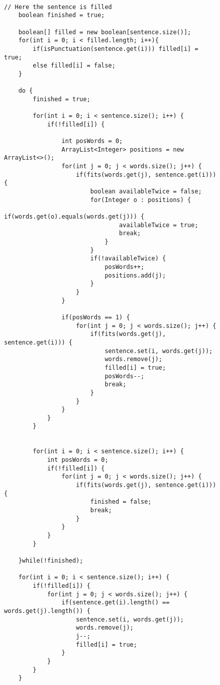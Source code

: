 \documentclass[a4paper, 12pt]{scrartcl}
\begin{document}
\begin{figure}[H]
    \centering
\begin{lstlisting}

// Here the sentence is filled
    boolean finished = true;
	        
    boolean[] filled = new boolean[sentence.size()];
    for(int i = 0; i < filled.length; i++){
        if(isPunctuation(sentence.get(i))) filled[i] = true;
        else filled[i] = false;
    }
    
    do {
        finished = true;
        
        for(int i = 0; i < sentence.size(); i++) {
            if(!filled[i]) {
                
                int posWords = 0;
                ArrayList<Integer> positions = new ArrayList<>();
                for(int j = 0; j < words.size(); j++) {
                    if(fits(words.get(j), sentence.get(i))) {
                        boolean availableTwice = false;
                        for(Integer o : positions) {
                            if(words.get(o).equals(words.get(j))) {
                                availableTwice = true;
                                break;
                            }
                        }
                        if(!availableTwice) {
                            posWords++;
                            positions.add(j);
                        }
                    }
                }
                
                if(posWords == 1) {
                    for(int j = 0; j < words.size(); j++) {
                        if(fits(words.get(j), sentence.get(i))) {
                            sentence.set(i, words.get(j));
                            words.remove(j);
                            filled[i] = true;
                            posWords--;
                            break;
                        }
                    }
                }
            }
        }
        
        
        for(int i = 0; i < sentence.size(); i++) {
            int posWords = 0;
            if(!filled[i]) {
                for(int j = 0; j < words.size(); j++) {
                    if(fits(words.get(j), sentence.get(i))) {
                        finished = false;
                        break;
                    }
                }
            }
        }
        
    }while(!finished);
    
    for(int i = 0; i < sentence.size(); i++) {
        if(!filled[i]) {
            for(int j = 0; j < words.size(); j++) {
                if(sentence.get(i).length() == words.get(j).length()) {
                    sentence.set(i, words.get(j));
                    words.remove(j);
                    j--;
                    filled[i] = true;
                }
            }
        }
    }


\end{lstlisting}
\end{figure}
\end{document}
